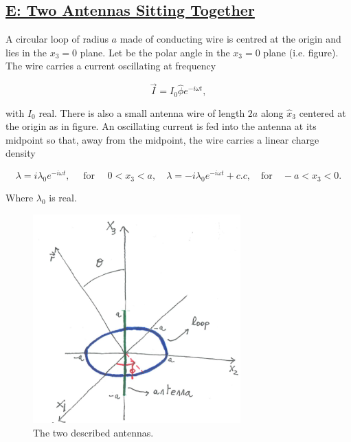 \subsection{\hyperref[E: Two Antennas Sitting Together]{E: Two Antennas Sitting Together}}

A circular loop of radius $a$ made of conducting wire is centred at the origin and lies in the $x_{3}=0$ plane. Let
be the polar angle in the $x_{3}=0$ plane (i.e. figure). The wire carries a current oscillating at frequency

\begin{equation}
	\vec{I}=I_{0} \hat{\phi} e^{-i \omega t},
\end{equation}

with $I_{0}$ real. There is also a small antenna wire of length $2a$ along $\hat{x}_{3}$ centered at the origin as in figure. An oscillating current is fed into the antenna at its midpoint so that, away from the midpoint, the wire carries a linear charge density

\begin{equation}
	\lambda=i \lambda_{0} e^{-i \omega t} ,\quad \text { for } \quad 0<x_{3}<a, \quad \lambda=-i \lambda_{0} e^{-i \omega t}+c . c, \quad \text{for} \quad -a < x_{3} < 0.
\end{equation}

Where $\lambda_{0}$ is real.

\begin{figure}[htbp!]
	\includegraphics[width=8cm]{figures/p2examoct19.png}
	\centering
	\caption{The two described antennas.}
\end{figure}

